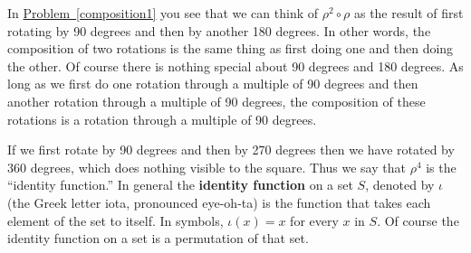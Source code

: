 \documentclass[10pt,]{book}
\newcommand{\terminology}[1]{\textbf{#1}}
\theoremstyle{plain}
\theoremstyle{definition}
\theoremstyle{definition}
\numberwithin{equation}{chapter}
\begin{document}
\hypertarget{p-1454}{}%
In \hyperref[composition1]{Problem~\ref{composition1}} you see that we can think of \(\rho^2\circ\rho\) as the result of first rotating by 90 degrees and then by another 180 degrees. In other words, the composition of two rotations is the same thing as first doing one and then doing the other. Of course there is nothing special about 90 degrees and 180 degrees.  As long as we first do one rotation through a multiple of 90 degrees and then another rotation through a multiple of 90 degrees, the composition of these rotations is a rotation through a multiple of 90 degrees.%
\par
\hypertarget{p-1455}{}%
If we first rotate by 90 degrees and then by 270 degrees then we have rotated by 360 degrees, which does nothing visible to the square. Thus we say that \(\rho^4\) is the ``identity function.'' In general the \terminology{identity function} on a set \(S\), denoted by \(\iota\) (the Greek letter iota, pronounced eye-oh-ta) is the function that takes each element of the set to itself. In symbols, \(\iota(x) =x\) for every \(x\) in \(S\). Of course the identity function on a set is a permutation of that set.%
\typeout{************************************************}
\typeout{************************************************}
\end{document}
